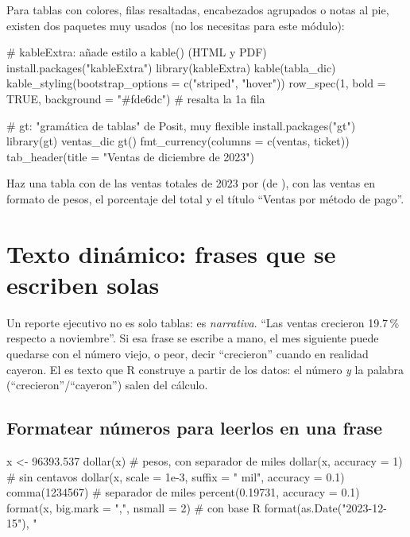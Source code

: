 Para tablas con colores, filas resaltadas, encabezados agrupados o notas al
pie, existen dos paquetes muy usados (no los necesitas para este módulo):

\begin{rnoejecutar}
# kableExtra: añade estilo a kable() (HTML y PDF)
install.packages("kableExtra")
library(kableExtra)
kable(tabla_dic) %
  kable_styling(bootstrap_options = c("striped", "hover")) %
  row_spec(1, bold = TRUE, background = "#fde6dc")   # resalta la 1a fila

# gt: "gramática de tablas" de Posit, muy flexible
install.packages("gt")
library(gt)
ventas_dic %
  gt() %
  fmt_currency(columns = c(ventas, ticket)) %
  tab_header(title = "Ventas de diciembre de 2023")
\end{rnoejecutar}

\begin{hazlotu}
Haz una tabla con  de las ventas totales de 2023 por
 (de ), con las ventas en
formato de pesos, el porcentaje del total y el título ``Ventas por método de
pago''.
\end{hazlotu}

\section{Texto dinámico: frases que se escriben solas}
\label{sec:m8-texto}

Un reporte ejecutivo no es solo tablas: es \emph{narrativa}. ``Las ventas
crecieron 19.7\,\% respecto a noviembre''. Si esa frase se escribe a mano,
el mes siguiente puede quedarse con el número viejo, o peor, decir
``crecieron'' cuando en realidad cayeron. El  es
texto que R construye a partir de los datos: el número \emph{y} la palabra
(``crecieron''/``cayeron'') salen del cálculo.

\subsection{Formatear números para leerlos en una frase}

\begin{rcode}
x <- 96393.537
dollar(x)                       # pesos, con separador de miles
dollar(x, accuracy = 1)         # sin centavos
dollar(x, scale = 1e-3, suffix = " mil", accuracy = 0.1)
comma(1234567)                  # separador de miles
percent(0.19731, accuracy = 0.1)
format(x, big.mark = ",", nsmall = 2)          # con base R
format(as.Date("2023-12-15"), "%
\end{rcode}

